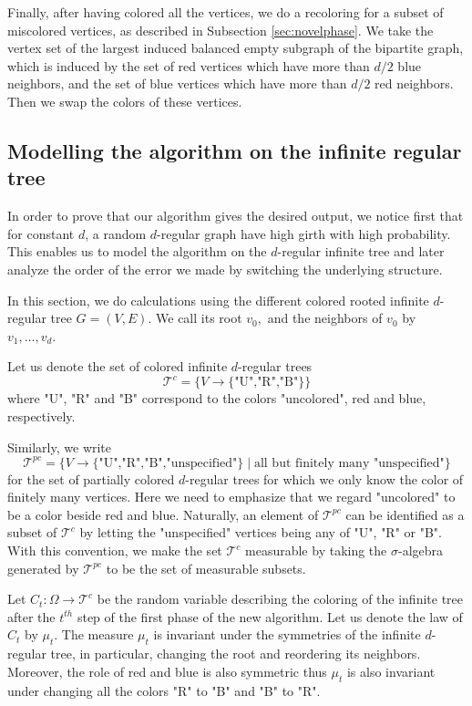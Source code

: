 \documentclass{article}
\theoremstyle{definition}
\begin{document}
Finally, after having colored all the vertices, we do a recoloring for a subset of miscolored vertices, as described in Subsection \ref{sec:novelphase}. We take the vertex set of the largest induced balanced empty subgraph of the bipartite graph, which is induced by the set of red vertices which have more than $d/2$ blue neighbors, and the set of blue vertices which have more than $d/2$ red neighbors. Then we swap the colors of these vertices.

\subsection{Modelling the algorithm on the infinite regular tree}

In order to prove that our algorithm gives the desired output, we notice first that for constant $d$, a random $d$-regular graph have high girth with high probability. This enables us to model the algorithm on the $d$-regular infinite tree and later analyze the order of the error we made by switching the underlying structure.

In this section, we do calculations using the different colored rooted infinite $d$-regular tree $G=(V,E).$ We call its root $v_0,$ and the neighbors of $v_0$ by $v_1,\dots,v_d.$

Let us denote the set of colored infinite $d$-regular trees $$\mathcal T^c=\{V\to\{\text{"U","R","B"}\}\}$$ where "U", "R" and "B" correspond to the colors "uncolored", red and blue, respectively.

Similarly, we write $$\mathcal T^{pc}=\{V\to\{\text{"U","R","B","unspecified"}\} \mid \text{all but finitely many "unspecified"}\}$$ for the set of partially colored $d$-regular trees for which we only know the color of finitely many vertices. Here we need to emphasize that we regard "uncolored" to be a color beside red and blue. Naturally, an element of $\mathcal T^{pc}$ can be identified as a subset of $\mathcal T^c$ by letting the "unspecified" vertices being any of "U", "R" or "B". With this convention, we make the set $\mathcal T^c$ measurable by taking the $\sigma$-algebra generated by $\mathcal T^{pc}$ to be the set of measurable subsets.

Let $C_t:\Omega\to\mathcal T^c$ be the random variable describing the coloring of the infinite tree after the $t^{th}$ step of the first phase of the new algorithm. Let us denote the law of $C_t$ by $\mu_t$. The measure $\mu_t$ is invariant under the symmetries of the infinite $d$-regular tree, in particular, changing the root and reordering its neighbors. Moreover, the role of red and blue is also symmetric thus $\mu_t$ is also invariant under changing all the colors "R" to "B" and "B" to "R".
\end{document}
